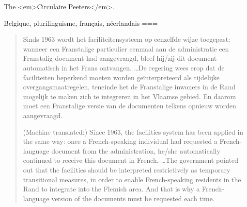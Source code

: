The <em>Circulaire Peeters</em>.

Belgique, plurilinguisme, français, néerlandais
===
\begin{quote}
    Sinds 1963 wordt het faciliteitensysteem op eenzelfde wijze toegepast: wanneer een Franstalige particulier eenmaal aan de administratie een Franstalig document had aangevraagd, bleef hij/zij dit document automatisch in het Frans ontvangen. …De regering wees erop dat de faciliteiten beperkend moeten worden geïnterpreteerd als tijdelijke overgangsmaatregelen, teneinde het de Franstalige inwoners in de Rand mogelijk te maken zich te integreren in het Vlaamse gebied. En daarom moet een Franstalige versie van de documenten telkens opnieuw worden aangevraagd.

    (Machine translated:) Since 1963, the facilities system has been applied in the same way: once a French-speaking individual had requested a French-language document from the administration, he/she automatically continued to receive this document in French. …The government pointed out that the facilities should be interpreted restrictively as temporary transitional measures, in order to enable French-speaking residents in the Rand to integrate into the Flemish area. And that is why a French-language version of the documents must be requested each time.
\end{quote}
\nocite{depre2001}